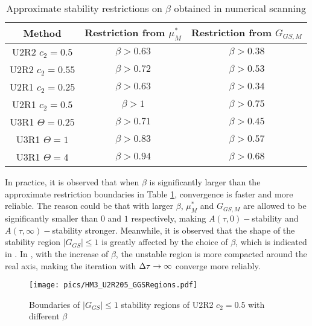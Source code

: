 \begin{table}[htbp]
    \centering
    \begin{tabular}{|c|c|c|}
        \hline
        Method             & Restriction from $\mu^*_{M}$ & Restriction from $G_{GS,M}$ \\
        \hline
        U2R2 $c_2=0.5$     & $\beta > 0.63$               & $\beta > 0.38$              \\
        \hline
        U2R2 $c_2=0.55$    & $\beta > 0.72$               & $\beta > 0.53$              \\
        \hline
        U2R1 $c_2=0.25$    & $\beta > 0.63$               & $\beta > 0.34$              \\
        \hline
        U2R1 $c_2=0.5$     & $\beta > 1$                  & $\beta > 0.75$              \\
        \hline
        U3R1 $\Theta=0.25$ & $\beta > 0.71$               & $\beta > 0.45$              \\
        \hline
        U3R1 $\Theta=1$    & $\beta > 0.83$               & $\beta > 0.57$              \\
        \hline
        U3R1 $\Theta=4$    & $\beta > 0.94$               & $\beta > 0.68$              \\
        \hline
    \end{tabular}
    \caption{Approximate stability restrictions on $\beta$ obtained in numerical scanning}
    \label{tab:resrictionBetaSearch}
\end{table}

In practice, it is observed that
when $\beta$ is significantly larger than the approximate
restriction boundaries in Table \ref{tab:resrictionBetaSearch},
convergence is faster and more reliable.
The reason could be that with larger $\beta$, $\mu^*_M$  and $G_{GS,M}$
are allowed to be significantly smaller than $0$ and $1$ respectively,
making $A(\tau,0)-$stability and
$A(\tau,\infty)-$stability stronger.
Meanwhile, it is observed that the shape of the stability region
$|G_{GS}|\leq1$ is greatly affected by the choice of $\beta$,
which is indicated in .
In , with the
increase of $\beta$, the unstable region is more
compacted around the real axis, making the iteration with ${\Delta}\tau\rightarrow\infty$
converge more reliably.
\begin{figure}[htbp]
    \centering
    \texttt{[image: pics/HM3\_U2R205\_GGSRegions.pdf]}
    \caption[]{Boundaries of $|G_{GS}|\leq1$ stability regions of U2R2 $c_2=0.5$ with different $\beta$}
    \label{fig:HM3_U2R205_GGSRegions}
\end{figure}

